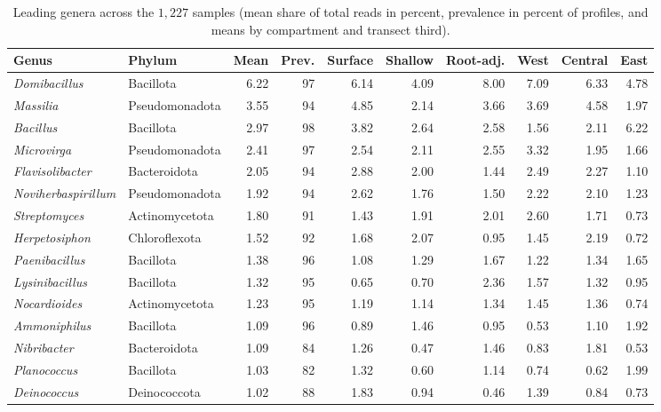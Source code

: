 \begin{table}[htbp]
\centering\footnotesize
\setlength{\tabcolsep}{4pt}
\caption{Leading genera across the $1{,}227$ samples (mean share of total reads in percent, prevalence in percent of profiles, and means by compartment and transect third).}
\label{tab:taxa_genera}
\begin{tabular}{llrrrrrrrr}
\toprule
Genus & Phylum & Mean & Prev. & Surface & Shallow & Root-adj. & West & Central & East \\
\midrule
\textit{Domibacillus} & Bacillota & 6.22 & 97 & 6.14 & 4.09 & 8.00 & 7.09 & 6.33 & 4.78 \\
\textit{Massilia} & Pseudomonadota & 3.55 & 94 & 4.85 & 2.14 & 3.66 & 3.69 & 4.58 & 1.97 \\
\textit{Bacillus} & Bacillota & 2.97 & 98 & 3.82 & 2.64 & 2.58 & 1.56 & 2.11 & 6.22 \\
\textit{Microvirga} & Pseudomonadota & 2.41 & 97 & 2.54 & 2.11 & 2.55 & 3.32 & 1.95 & 1.66 \\
\textit{Flavisolibacter} & Bacteroidota & 2.05 & 94 & 2.88 & 2.00 & 1.44 & 2.49 & 2.27 & 1.10 \\
\textit{Noviherbaspirillum} & Pseudomonadota & 1.92 & 94 & 2.62 & 1.76 & 1.50 & 2.22 & 2.10 & 1.23 \\
\textit{Streptomyces} & Actinomycetota & 1.80 & 91 & 1.43 & 1.91 & 2.01 & 2.60 & 1.71 & 0.73 \\
\textit{Herpetosiphon} & Chloroflexota & 1.52 & 92 & 1.68 & 2.07 & 0.95 & 1.45 & 2.19 & 0.72 \\
\textit{Paenibacillus} & Bacillota & 1.38 & 96 & 1.08 & 1.29 & 1.67 & 1.22 & 1.34 & 1.65 \\
\textit{Lysinibacillus} & Bacillota & 1.32 & 95 & 0.65 & 0.70 & 2.36 & 1.57 & 1.32 & 0.95 \\
\textit{Nocardioides} & Actinomycetota & 1.23 & 95 & 1.19 & 1.14 & 1.34 & 1.45 & 1.36 & 0.74 \\
\textit{Ammoniphilus} & Bacillota & 1.09 & 96 & 0.89 & 1.46 & 0.95 & 0.53 & 1.10 & 1.92 \\
\textit{Nibribacter} & Bacteroidota & 1.09 & 84 & 1.26 & 0.47 & 1.46 & 0.83 & 1.81 & 0.53 \\
\textit{Planococcus} & Bacillota & 1.03 & 82 & 1.32 & 0.60 & 1.14 & 0.74 & 0.62 & 1.99 \\
\textit{Deinococcus} & Deinococcota & 1.02 & 88 & 1.83 & 0.94 & 0.46 & 1.39 & 0.84 & 0.73 \\
\bottomrule
\end{tabular}
\end{table}

